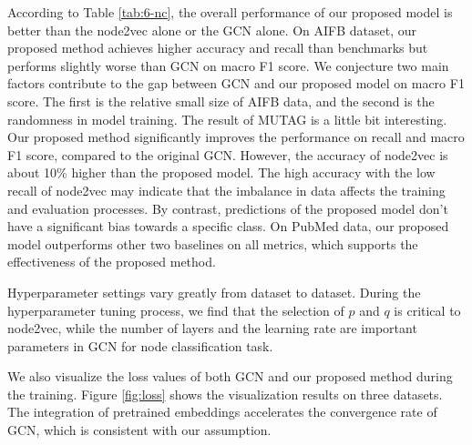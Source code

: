 \documentclass[sigconf]{acmart}
\begin{document}
According to Table \ref{tab:6-nc}, the overall performance of our proposed model is better than the node2vec alone or the GCN alone. On AIFB dataset, our proposed method achieves higher accuracy and recall than benchmarks but performs slightly worse than GCN on macro F1 score. We conjecture two main factors contribute to the gap between GCN and our proposed model on macro F1 score. The first is the relative small size of AIFB data, and the second is the randomness in model training. The result of MUTAG is a little bit interesting. Our proposed method significantly improves the performance on recall and macro F1 score, compared to the original GCN. However, the accuracy of node2vec is about 10\% higher than the proposed model. The high accuracy with the low recall of node2vec may indicate that the imbalance in data affects the training and evaluation processes. By contrast, predictions of the proposed model don't have a significant bias towards a specific class. On PubMed data, our proposed model outperforms other two baselines on all metrics, which supports the effectiveness of the proposed method.

Hyperparameter settings vary greatly from dataset to dataset. During the hyperparameter tuning process, we find that the selection of $p$ and $q$ is critical to node2vec, while the number of layers and the learning rate are important parameters in GCN for node classification task.

We also visualize the loss values of both GCN and our proposed method during the training. Figure \ref{fig:loss} shows the visualization results on three datasets. The integration of pretrained embeddings accelerates the convergence rate of GCN, which is consistent with our assumption.
\end{document}
